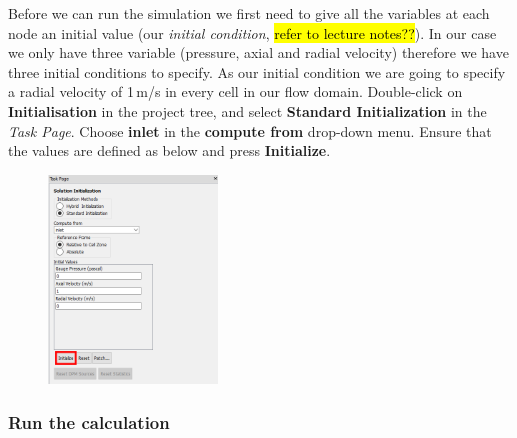 \documentclass[11pt,a4paper,oneside,hidelinks]{scrartcl}
\newcommand\bfr[1]{\textcolor[rgb]{1,0.00,0.00}{\textbf{\textsf{#1}}}}
\begin{document}
Before we can run the simulation we first need to give all the variables at each node an initial value (our \emph{initial condition}, \hl{refer to lecture notes??}). In our case we only have three variable (pressure, axial and radial velocity) therefore we have three initial conditions to specify. As our initial condition we are going to specify a radial velocity of 1\,m/s in every cell in our flow domain. Double-click on \bfr{Initialisation} in the project tree, and select \bfr{Standard Initialization} in the \emph{Task Page}. Choose \bfr{inlet} in the \bfr{compute from} drop-down menu. Ensure that the values are defined as below and press \bfr{Initialize}.
\begin{figure}[H]
\begin{center}
\includegraphics[width=0.4\textwidth,clip]{initialization.png}
\end{center}
\end{figure}


\subsubsection{Run the calculation}
\end{document}
